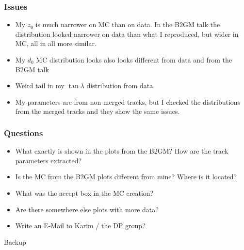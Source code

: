 \documentclass[18pt]{beamer}
\begin{document}
\begin{frame}
  \frametitle{Issues}
  \begin{itemize}
  \item My $z_0$ is much narrower on MC than on data. In the B2GM talk the distribution looked narrower on data than what I reproduced, but wider in MC, all in all more similar.
  \item My $d_0$ MC distribution looks also looks different from data and from the B2GM talk
  \item Weird tail in my $\tan \lambda$ distribution from data.
  \item My parameters are from non-merged tracks, but I checked the distributions from the merged tracks and they show the same issues.
  \end{itemize}
\end{frame}

\begin{frame}
  \frametitle{Questions}
  \begin{itemize}
  \item What exactly is shown in the plots from the B2GM? How are the track parameters extracted?
  \item Is the MC from the B2GM plots different from mine? Where is it located?
  \item What was the accept box in the MC creation?
  \item Are there somewhere else plots with more data?
  \item Write an E-Mail to Karim / the DP group?
  \end{itemize}
\end{frame}


\appendix
\backupbegin

\begin{frame}
  \begin{center}
    \huge Backup
  \end{center}
\end{frame}
\end{document}
